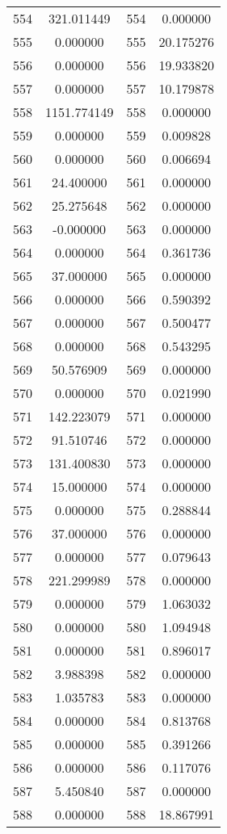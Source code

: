 \documentclass[12pt]{article}
\begin{document}
\begin{longtable}{@{}cccc@{}}
554 & 321.011449 & 554 & 0.000000 \\
555 & 0.000000 & 555 & 20.175276 \\
556 & 0.000000 & 556 & 19.933820 \\
557 & 0.000000 & 557 & 10.179878 \\
558 & 1151.774149 & 558 & 0.000000 \\
559 & 0.000000 & 559 & 0.009828 \\
560 & 0.000000 & 560 & 0.006694 \\
561 & 24.400000 & 561 & 0.000000 \\
562 & 25.275648 & 562 & 0.000000 \\
563 & -0.000000 & 563 & 0.000000 \\
564 & 0.000000 & 564 & 0.361736 \\
565 & 37.000000 & 565 & 0.000000 \\
566 & 0.000000 & 566 & 0.590392 \\
567 & 0.000000 & 567 & 0.500477 \\
568 & 0.000000 & 568 & 0.543295 \\
569 & 50.576909 & 569 & 0.000000 \\
570 & 0.000000 & 570 & 0.021990 \\
571 & 142.223079 & 571 & 0.000000 \\
572 & 91.510746 & 572 & 0.000000 \\
573 & 131.400830 & 573 & 0.000000 \\
574 & 15.000000 & 574 & 0.000000 \\
575 & 0.000000 & 575 & 0.288844 \\
576 & 37.000000 & 576 & 0.000000 \\
577 & 0.000000 & 577 & 0.079643 \\
578 & 221.299989 & 578 & 0.000000 \\
579 & 0.000000 & 579 & 1.063032 \\
580 & 0.000000 & 580 & 1.094948 \\
581 & 0.000000 & 581 & 0.896017 \\
582 & 3.988398 & 582 & 0.000000 \\
583 & 1.035783 & 583 & 0.000000 \\
584 & 0.000000 & 584 & 0.813768 \\
585 & 0.000000 & 585 & 0.391266 \\
586 & 0.000000 & 586 & 0.117076 \\
587 & 5.450840 & 587 & 0.000000 \\
588 & 0.000000 & 588 & 18.867991 \\

\end{longtable}
\end{document}
